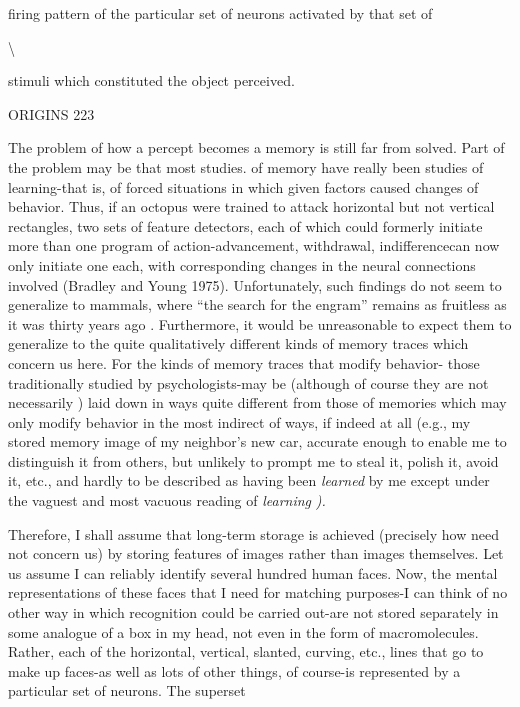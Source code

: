 firing pattern of the particular set of neurons activated by that set of

{\textbackslash}

stimuli which constituted the object perceived.

ORIGINS 223

The problem of how a percept becomes a memory is still far from solved. Part of the problem may be that most studies. of memory have really been studies of learning-that is, of forced situations in which given factors caused changes of behavior. Thus, if an octopus were trained to attack horizontal but not vertical rectangles, two sets of feature detectors, each of which could formerly initiate more than one program of action-advancement, withdrawal, indifference\-can now only initiate one each, with corresponding changes in the neural connections involved (Bradley and Young 1975). Unfortunately, such findings do not seem to generalize to mammals, where ``the search for the engram'' remains as fruitless as it was thirty years ago \citep{Lashley1950}. Furthermore, it would be unreasonable to expect them to generalize to the quite qualitatively different kinds of memory traces which concern us here. For the kinds of memory traces that modify behavior- those traditionally studied by psychologists-may be (although of course they are not necessarily ) laid down in ways quite different from those of memories which may only modify beha\-vior in the most indirect of ways, if indeed at all (e.g., my stored memory image of my neighbor's new car, accurate enough to enable me to distinguish it from others, but unlikely to prompt me to steal it, polish it, avoid it, etc., and hardly to be described as having been \textit{learned} by me except under the vaguest and most vacuous reading of \textit{learning} \textit{).}

Therefore, I shall assume that long-term storage is achieved (precisely how need not concern us) by storing features of images rather than images themselves. Let us assume I can reliably identify several hundred human faces. Now, the mental representations of these faces that I need for matching purposes-I can think of no other way in which recognition could be carried out-are not stored separately in some analogue of a box in my head, not even in the form of macro\-molecules. Rather, each of the horizontal, vertical, slanted, curving, etc., lines that go to make up faces-as well as lots of other things, of course-is represented by a particular set of neurons. The superset

